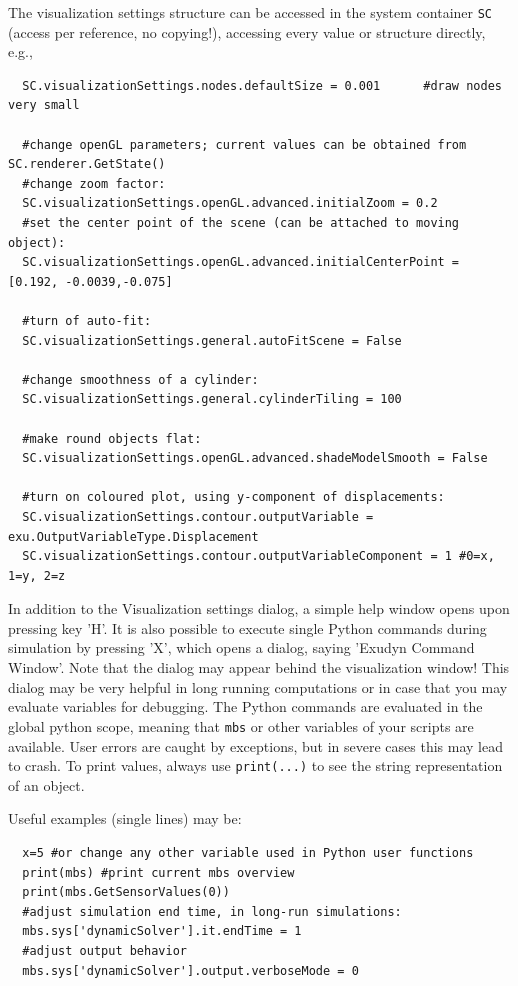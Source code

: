 \noindent
The visualization settings structure can be accessed in the system container \texttt{SC} (access per reference, no copying!), accessing every value or structure directly, e.g.,
\pythonstyle\begin{lstlisting}
  SC.visualizationSettings.nodes.defaultSize = 0.001      #draw nodes very small

  #change openGL parameters; current values can be obtained from SC.renderer.GetState()
  #change zoom factor:
  SC.visualizationSettings.openGL.advanced.initialZoom = 0.2       
  #set the center point of the scene (can be attached to moving object):
  SC.visualizationSettings.openGL.advanced.initialCenterPoint = [0.192, -0.0039,-0.075]

  #turn of auto-fit:
  SC.visualizationSettings.general.autoFitScene = False

  #change smoothness of a cylinder:
  SC.visualizationSettings.general.cylinderTiling = 100
  
  #make round objects flat:
  SC.visualizationSettings.openGL.advanced.shadeModelSmooth = False

  #turn on coloured plot, using y-component of displacements:
  SC.visualizationSettings.contour.outputVariable = exu.OutputVariableType.Displacement
  SC.visualizationSettings.contour.outputVariableComponent = 1 #0=x, 1=y, 2=z
\end{lstlisting}

%
In addition to the Visualization settings dialog, a simple help window opens upon pressing key 'H'. 
It is also possible to execute single Python commands during simulation by pressing 'X', which opens a dialog, saying 'Exudyn Command Window'. 
Note that the dialog may appear behind the visualization window!
This dialog may be very helpful in long running computations or in case that you may evaluate variables for debugging.
The Python commands are evaluated in the global python scope, meaning that \texttt{mbs} or other variables of your scripts are available.
User errors are caught by exceptions, but in severe cases this may lead to crash.
To print values, always use \texttt{print(...)} to see the string representation of an object.

\noindent Useful examples (single lines) may be: 
\pythonstyle\begin{lstlisting}
  x=5 #or change any other variable used in Python user functions
  print(mbs) #print current mbs overview
  print(mbs.GetSensorValues(0))
  #adjust simulation end time, in long-run simulations:
  mbs.sys['dynamicSolver'].it.endTime = 1 
  #adjust output behavior
  mbs.sys['dynamicSolver'].output.verboseMode = 0
\end{lstlisting}

